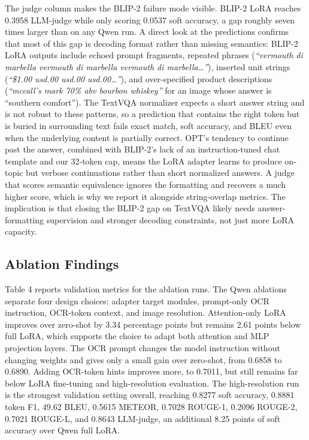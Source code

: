 \documentclass[11pt]{article}
\begin{document}
The judge column makes the BLIP-2 failure mode visible. BLIP-2 LoRA reaches 0.3958 LLM-judge while only scoring 0.0537 soft accuracy, a gap roughly seven times larger than on any Qwen run. A direct look at the predictions confirms that most of this gap is decoding format rather than missing semantics: BLIP-2 LoRA outputs include echoed prompt fragments, repeated phrases (\textit{``vermouth di marbella vermouth di marbella vermouth di marbella\ldots''}), inserted unit strings (\textit{``\$1.00 usd.00 usd.00 usd.00\ldots''}), and over-specified product descriptions (\textit{``mccall's mark 70\% abv bourbon whiskey''} for an image whose answer is ``southern comfort''). The TextVQA normalizer expects a short answer string and is not robust to these patterns, so a prediction that contains the right token but is buried in surrounding text fails exact match, soft accuracy, and BLEU even when the underlying content is partially correct. OPT's tendency to continue past the answer, combined with BLIP-2's lack of an instruction-tuned chat template and our 32-token cap, means the LoRA adapter learns to produce on-topic but verbose continuations rather than short normalized answers. A judge that scores semantic equivalence ignores the formatting and recovers a much higher score, which is why we report it alongside string-overlap metrics. The implication is that closing the BLIP-2 gap on TextVQA likely needs answer-formatting supervision and stronger decoding constraints, not just more LoRA capacity.

\subsection{Ablation Findings}

Table 4 reports validation metrics for the ablation runs. The Qwen ablations separate four design choices: adapter target modules, prompt-only OCR instruction, OCR-token context, and image resolution. Attention-only LoRA improves over zero-shot by 3.34 percentage points but remains 2.61 points below full LoRA, which supports the choice to adapt both attention and MLP projection layers. The OCR prompt changes the model instruction without changing weights and gives only a small gain over zero-shot, from 0.6858 to 0.6890. Adding OCR-token hints improves more, to 0.7011, but still remains far below LoRA fine-tuning and high-resolution evaluation. The high-resolution run is the strongest validation setting overall, reaching 0.8277 soft accuracy, 0.8881 token F1, 49.62 BLEU, 0.5615 METEOR, 0.7028 ROUGE-1, 0.2096 ROUGE-2, 0.7021 ROUGE-L, and 0.8643 LLM-judge, an additional 8.25 points of soft accuracy over Qwen full LoRA.
\end{document}
